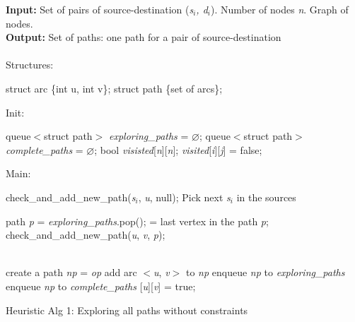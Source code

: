 \begin{algorithm}
\textbf{Input:} Set of pairs of source-destination (\textit{s$_i$, d$_i$}). Number of nodes \textit{n}. Graph of nodes. \\
\textbf{Output:} Set of paths: one path for a pair of source-destination \\
\\
Structures:
\begin{algorithmic}
\State struct arc \{int u, int v\};
\State struct path \{set of arcs\};
\end{algorithmic}
Init:
    \begin{algorithmic}
	\State queue$<$struct path$>$ \textit{exploring\_paths} = $\varnothing$;
	\State queue$<$struct path$>$ \textit{complete\_paths} = $\varnothing$;
	\State bool \textit{visisted}[\textit{n}][\textit{n}];
	    \State \textit{visited}[{\it i}][{\it j}] = false;
	\EndFor
    \end{algorithmic}
Main:

\begin{algorithmic}

	\State check\_and\_add\_new\_path({\it s}$_i$, \textit{u}, null);
	\State Pick next \textit{s$_i$} in the sources
    \EndWhile

	\State path \textit{p} = \textit{exploring\_paths}.pop();
	 = last vertex in the path {\it p};
	    \State check\_and\_add\_new\_path({\it u}, \textit{v}, {\it p});
	\EndFor
    \EndWhile

    \EndFunction
\\
	    \State create a path \textit{np} = {\it op}
	    \State add arc $<$\textit{u}, \textit{v}$>$ to \textit{np}
	    \State enqueue \textit{np} to \textit{exploring\_paths}
	        \State enqueue \textit{np} to \textit{complete\_paths}
            \EndIf
	    [\textit{u}][\textit{v}] = true;
	\EndIf
    \EndFunction
\end{algorithmic}

\caption{Heuristic Alg 1: Exploring all paths without constraints}
\label{alg:h1}

\end{algorithm}

